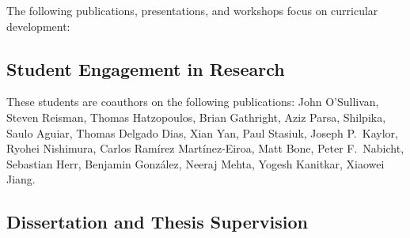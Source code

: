 The following publications, presentations, and workshops focus on curricular development:

\begin{refsection}
\nocite{Scala_2019}
\nocite{CDERBook}
\nocite{ScalaDays_2017}
\nocite{wl_honig_framework_2015}
\nocite{mark_lewis_scala_2014}
\nocite{mark_lewis_using_2013}
\nocite{EduPar2012}
\nocite{EduPar2011}
\nocite{2003_AOSD}
\nocite{chung2003}
\nocite{Triveni_OOPSLAEDU_1998}
\nocite{Laufer_MCC_1997}
\printbibliography[heading=none,sorting=ynt]
\end{refsection}
   

\subsection{Student Engagement in Research}

These students are coauthors on the following publications:
John O’Sullivan,
Steven Reisman, 
Thomas Hatzopoulos, 
Brian Gathright, 
Aziz Parsa,
Shilpika, 
Saulo Aguiar,
Thomas Delgado Dias, 
Xian Yan,
Paul Stasiuk,
Joseph P.\ Kaylor,
Ryohei Nishimura, 
Carlos Ramírez Martínez-Eiroa,
Matt Bone, 
Peter F.\ Nabicht,
Sebastian Herr,
Benjamin González,
Neeraj Mehta, 
Yogesh Kanitkar,
Xiaowei Jiang.

\begin{refsection}
\nocite{Scala_2019}
\nocite{doi:10.4137/EBO.S32757}
\nocite{WSSSPE_2015}
\nocite{GCASR_2015}
\nocite{GCASR_2015}
\nocite{gcasr_2013_environmental_data}
\nocite{gcasr_2013_tablets}
\nocite{kaylor_simplifying_2012}
\nocite{kaylor_restfs_2011}
\nocite{DBLP:conf/icsoft/2011-2}
\nocite{george_k_thiruvathukal_virtualization_2010}
\nocite{kaylor_online_2010}
\nocite{k_laufer_putting_2009}
\nocite{DBLP:conf/seke/HerrLSTW08}
\nocite{matt_bone_taming_2008}
\nocite{IPDPS_2007}
\nocite{konstantin_laufer_hike_2007}
\nocite{chung2003}
\nocite{DBLP:conf/cp/GuptaJJJL00}
\printbibliography[heading=none,sorting=ynt]
\end{refsection}


\subsection{Dissertation and Thesis Supervision}


